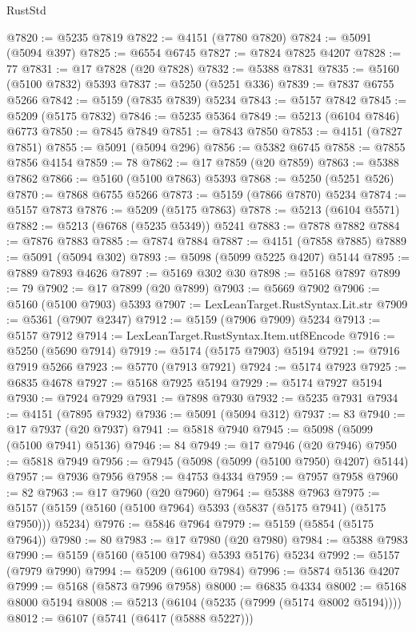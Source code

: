 \begin{lexlean}{RustStd}
\begin{coremodule}
@7820 := @5235 @7819
@7822 := @4151 (@7780 @7820)
@7824 := @5091 (@5094 @397)
@7825 := @6554 @6745
@7827 := @7824 @7825 @4207
@7828 := 77
@7831 := @17 @7828 (@20 @7828)
@7832 := @5388 @7831
@7835 := @5160 (@5100 @7832) @5393
@7837 := @5250 (@5251 @336)
@7839 := @7837 @6755 @5266
@7842 := @5159 (@7835 @7839) @5234
@7843 := @5157 @7842
@7845 := @5209 (@5175 @7832)
@7846 := @5235 @5364
@7849 := @5213 (@6104 @7846) @6773
@7850 := @7845 @7849
@7851 := @7843 @7850
@7853 := @4151 (@7827 @7851)
@7855 := @5091 (@5094 @296)
@7856 := @5382 @6745
@7858 := @7855 @7856 @4154
@7859 := 78
@7862 := @17 @7859 (@20 @7859)
@7863 := @5388 @7862
@7866 := @5160 (@5100 @7863) @5393
@7868 := @5250 (@5251 @526)
@7870 := @7868 @6755 @5266
@7873 := @5159 (@7866 @7870) @5234
@7874 := @5157 @7873
@7876 := @5209 (@5175 @7863)
@7878 := @5213 (@6104 @5571)
@7882 := @5213 (@6768 (@5235 @5349)) @5241
@7883 := @7878 @7882
@7884 := @7876 @7883
@7885 := @7874 @7884
@7887 := @4151 (@7858 @7885)
@7889 := @5091 (@5094 @302)
@7893 := @5098 (@5099 @5225 @4207) @5144
@7895 := @7889 @7893 @4626
@7897 := @5169 @302 @30
@7898 := @5168 @7897
@7899 := 79
@7902 := @17 @7899 (@20 @7899)
@7903 := @5669 @7902
@7906 := @5160 (@5100 @7903) @5393
@7907 := LexLeanTarget.RustSyntax.Lit.str
@7909 := @5361 (@7907 @2347)
@7912 := @5159 (@7906 @7909) @5234
@7913 := @5157 @7912
@7914 := LexLeanTarget.RustSyntax.Item.utf8Encode
@7916 := @5250 (@5690 @7914)
@7919 := @5174 (@5175 @7903) @5194
@7921 := @7916 @7919 @5266
@7923 := @5770 (@7913 @7921)
@7924 := @5174 @7923
@7925 := @6835 @4678
@7927 := @5168 @7925 @5194
@7929 := @5174 @7927 @5194
@7930 := @7924 @7929
@7931 := @7898 @7930
@7932 := @5235 @7931
@7934 := @4151 (@7895 @7932)
@7936 := @5091 (@5094 @312)
@7937 := 83
@7940 := @17 @7937 (@20 @7937)
@7941 := @5818 @7940
@7945 := @5098 (@5099 (@5100 @7941) @5136)
@7946 := 84
@7949 := @17 @7946 (@20 @7946)
@7950 := @5818 @7949
@7956 := @7945 (@5098 (@5099 (@5100 @7950) @4207) @5144)
@7957 := @7936 @7956
@7958 := @4753 @4334
@7959 := @7957 @7958
@7960 := 82
@7963 := @17 @7960 (@20 @7960)
@7964 := @5388 @7963
@7975 := @5157 (@5159 (@5160 (@5100 @7964) @5393 (@5837 (@5175 @7941) (@5175 @7950))) @5234)
@7976 := @5846 @7964
@7979 := @5159 (@5854 (@5175 @7964))
@7980 := 80
@7983 := @17 @7980 (@20 @7980)
@7984 := @5388 @7983
@7990 := @5159 (@5160 (@5100 @7984) @5393 @5176) @5234
@7992 := @5157 (@7979 @7990)
@7994 := @5209 (@6100 @7984)
@7996 := @5874 @5136 @4207
@7999 := @5168 (@5873 @7996 @7958)
@8000 := @6835 @4334
@8002 := @5168 @8000 @5194
@8008 := @5213 (@6104 (@5235 (@7999 (@5174 @8002 @5194))))
@8012 := @6107 (@5741 (@6417 (@5888 @5227)))

\end{coremodule}
\end{lexlean}
